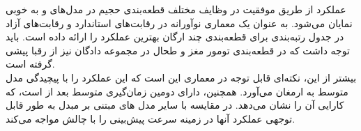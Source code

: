 عملکرد  از طریق موفقیت در وظایف مختلف قطعه‌بندی حجیم در مدل‌های و به خوبی نمایان می‌شود.  به عنوان یک معماری‌ نوآورانه در رقابت‌های استاندارد و رقابت‌های آزاد در جدول رتبه‌بندی برای قطعه‌بندی چند ارگان بهترین عملکرد را ارائه داده است. باید توجه داشت که در قطعه‌بندی تومور مغز و طحال در مجموعه دادگان  نیز  از رقبا پیشی گرفته است.
\\
بیشتر از این، نکته‌ای قابل توجه در معماری  این است که این عملکرد را با پیچیدگی مدل متوسط به ارمغان می‌آورد. همچنین، دارای دومین زمان‌گیری متوسط بعد از است، که کارایی آن را نشان می‌دهد. در مقایسه با سایر مدل های مبتنی بر مبدل به طور قابل توجهی عملکرد آنها در زمینه سرعت پیش‌بینی را با چالش مواجه می‌کند\cite{hatamizadeh2022unetr}.


